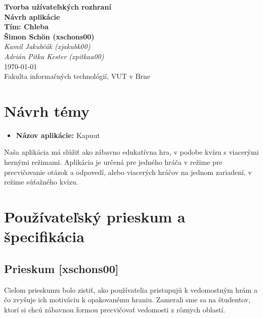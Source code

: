 \documentclass[a4paper,12pt]{article}
\begin{document}
    
    \begin{titlepage}
    	\centering
    	\vspace*{3cm}
    	{\Huge \textbf{Tvorba užívateľských rozhraní}}\\[1em]
    	{\Large \textbf{Návrh aplikácie}}\\[5em]
    	    
    	{\Large \textbf{Tím: Chleba}}\\[2em]
    	{\large
    		\textbf{Šimon Schön (xschons00)}\\
    		\textit{Kamil Jakubčák (xjakubk00)}\\
    		\textit{Adrián Pitka Kester (xpitkaa00)}
    		}\\[6em]
    	    
    	{\large \today}\\[20em]
    	    
    	{\large Fakulta informačných technológií, VUT v Brne}
    	\vfill
    \end{titlepage}
    
    \tableofcontents
    \newpage
    
    \section{Návrh témy}
    \begin{itemize}
    	\item \textbf{Názov aplikácie:} Kapuut \\
    \end{itemize}
    
    Naša aplikácia má slúžiť ako zábavno edukatívna hra, v podobe kvízu s viacerými hernými režimami. Aplikácia je určená pre jedného hráča v režime pre precvičovanie otázok a odpovedí, alebo viacerých hráčov na jednom zariadení, v režime súťažného kvízu.
    
    \section{Používateľský prieskum a špecifikácia}
    
    \subsection{Prieskum [xschons00]}
    Cieľom prieskumu bolo zistiť, ako používatelia pristupujú k vedomostným hrám a čo zvyšuje ich motiváciu k opakovanému hraniu. Zamerali sme sa na študentov, ktorí si chcú zábavnou formou precvičovať vedomosti z rôznych oblastí.
    \\
    
\end{document}
